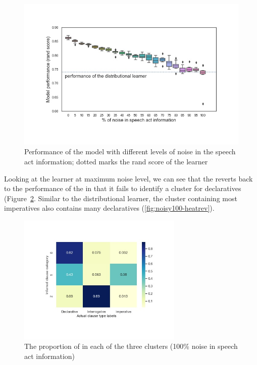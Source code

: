 \begin{figure}[H]
    \centering
    \includegraphics[width=1\textwidth]{figures/noisy-rand-compare.jpg}
    \caption{Performance of the \plearnerabbr{} model with different levels of noise in the speech act information; dotted marks the rand score of the \dlearnerabbr{} learner}
    \label{fig:noisy-rand-compare}
\end{figure}


Looking at the learner at maximum noise level, we can see that the \plearnerabbr{} reverts back to the performance of the \dlearnerabbr{} in that it fails to identify a cluster for declaratives (Figure~\ref{fig:noisy100-heatmap}. Similar to the distributional learner, the cluster containing most imperatives also contains many declaratives (\ref{fig:noisy100-heatrev}). 

\begin{figure}[H]
    \centering
    \includegraphics[width=0.7\textwidth]{figures/noisy100-heatmap.jpg}
    \caption{The proportion of \diis{} in each of the three clusters (100\% noise in speech act information) }
    \label{fig:noisy100-heatmap}
\end{figure}

